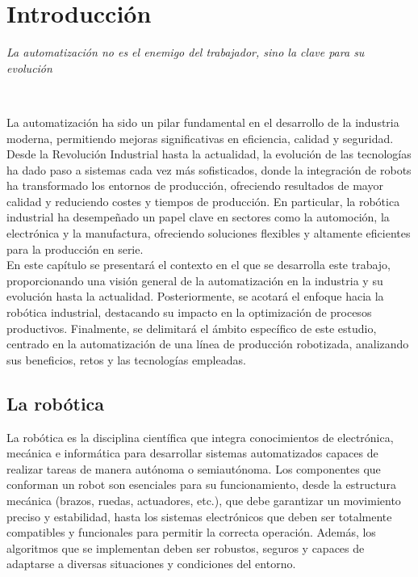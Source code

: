 \chapter{Introducción}
\label{cap:capitulo1}
\setcounter{page}{1}

\begin{flushright}
\begin{minipage}[]{10cm}
\emph{La automatización no es el enemigo del trabajador, sino la clave para su evolución}\\
\end{minipage}\\
\end{flushright}

\vspace{1cm}

La automatización ha sido un pilar fundamental en el desarrollo de la industria moderna, permitiendo mejoras significativas en eficiencia, calidad y seguridad. Desde la Revolución Industrial hasta la actualidad, la evolución de las tecnologías ha dado paso a sistemas cada vez más sofisticados, donde la integración de robots ha transformado los entornos de producción, ofreciendo resultados de mayor calidad y reduciendo costes y tiempos de producción. En particular, la robótica industrial ha desempeñado un papel clave en sectores como la automoción, la electrónica y la manufactura, ofreciendo soluciones flexibles y altamente eficientes para la producción en serie.\\

En este capítulo se presentará el contexto en el que se desarrolla este trabajo, proporcionando una visión general de la automatización en la industria y su evolución hasta la actualidad. Posteriormente, se acotará el enfoque hacia la robótica industrial, destacando su impacto en la optimización de procesos productivos. Finalmente, se delimitará el ámbito específico de este estudio, centrado en la automatización de una línea de producción robotizada, analizando sus beneficios, retos y las tecnologías empleadas.

\section{La robótica}
\label{sec:miseccion} %

La robótica es la disciplina científica que integra conocimientos de electrónica, mecánica e informática para desarrollar sistemas automatizados capaces de realizar tareas de manera autónoma o semiautónoma. Los componentes que conforman un robot son esenciales para su funcionamiento, desde la estructura mecánica (brazos, ruedas, actuadores, etc.), que debe garantizar un movimiento preciso y estabilidad, hasta los sistemas electrónicos que deben ser totalmente compatibles y funcionales para permitir la correcta operación. Además, los algoritmos que se implementan deben ser robustos, seguros y capaces de adaptarse a diversas situaciones y condiciones del entorno. \\

